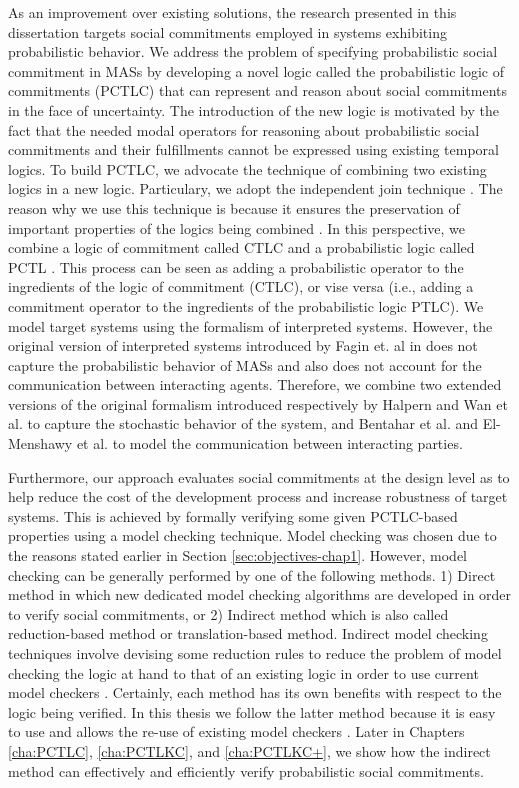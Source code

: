 As an improvement over existing solutions, the research presented in this dissertation targets social commitments employed in systems exhibiting probabilistic behavior. We address the problem of specifying probabilistic social commitment in MASs by developing a novel logic called the probabilistic logic of commitments (PCTLC) that can represent and reason about social commitments in the face of uncertainty. The introduction of the new logic is motivated by the fact that the needed modal operators for reasoning about probabilistic social commitments and their fulfillments cannot be expressed using existing temporal logics. To build PCTLC, we advocate the technique of combining two existing logics in a new logic. Particulary, we adopt the independent join technique \cite{Bennett2002,Franceschet2004,Gabbay2003}. The reason why we use this technique is because it ensures the preservation of important properties of the logics being combined \cite{Konur2013}. In this perspective, we combine a logic of commitment called CTLC \cite{Bentahar2012,El-Menshawy2013a} and a probabilistic logic called PCTL \cite{Hansson1994}. This process can be seen as adding a probabilistic operator to the ingredients of the logic of commitment (CTLC), or vise versa (i.e., adding a commitment operator to the ingredients of the probabilistic logic PTLC). We model target systems using the formalism of interpreted systems. However, the original version
of interpreted systems introduced by Fagin et. al in \cite{Fagin1995} does not capture the probabilistic behavior of MASs and also does not account for the communication between interacting agents. Therefore, we combine two extended versions of the original formalism introduced respectively by Halpern \cite{Halpern2003} and Wan et al. \cite{Wan2013} to capture the stochastic behavior of the system, and Bentahar et al. \cite{Bentahar2012} and El-Menshawy et al. \cite{El-Menshawy2013a} to model the communication between interacting parties.

Furthermore, our approach evaluates social commitments at the design level as to help reduce the cost of the development process and increase robustness of target systems. This is achieved by formally verifying some given PCTLC-based properties using a model checking technique. Model checking was chosen due to the reasons stated earlier in Section \ref{sec:objectives-chap1}. However, model checking can be generally performed by one of the following methods. 1) Direct method in which new dedicated model checking algorithms are developed in order to verify social commitments, or 2) Indirect method which is also called reduction-based method or translation-based method. Indirect model checking techniques involve devising some reduction rules to reduce the problem of model checking the logic at hand to that of an existing logic in order to use current model checkers \cite{Lomuscio2007}. Certainly, each method has its own benefits with respect to the logic being verified. In this thesis we follow the latter method because it is easy to use and allows the re-use of existing model checkers \cite{El-Menshawy2013a}. Later in Chapters \ref{cha:PCTLC}, \ref{cha:PCTLKC}, and \ref{cha:PCTLKC+}, we show how the indirect method can effectively and efficiently verify probabilistic social commitments.

